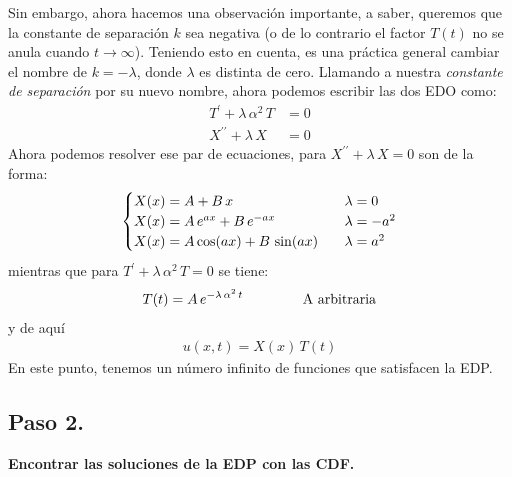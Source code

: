 \par
Sin embargo, ahora hacemos una observación importante, a saber, queremos que la constante de separación $k$ sea negativa (o de lo contrario el factor $T (t)$ no se anula cuando $t \to \infty$). Teniendo esto en cuenta, es una práctica general cambiar el nombre de $k = - \lambda$, donde $\lambda$ es distinta de cero. Llamando a nuestra \emph{constante de separación} por su nuevo nombre, ahora podemos escribir las dos EDO como:
\begin{align*}
T^{\prime} + \lambda \, \alpha^{2} \, T &= 0 \\[0.5em]
X^{\prime \prime} + \lambda \, X &= 0
\end{align*}
Ahora podemos resolver ese par de ecuaciones, para $X^{\prime \prime} + \lambda \, X = 0$ son de la forma:
\begin{align}
\begin{cases}
X(x) = A + B \, x & \hspace{0.2cm} \lambda = 0 \\
X(x) = A \, e^{a x} + B \, e^{-a x} & \hspace{0.2cm} \lambda = - a^{2} \\
X(x) = A \cos (a x ) + B \, \sin (a x) & \hspace{0.2cm} \lambda = a^{2}
\end{cases}
\label{eq:ecuacion_06_02_31}
\end{align}
mientras que para $T^{\prime} + \lambda \, \alpha^{2} \, T = 0$ se tiene:
\begin{align}
T(t) = A \, e^{- \lambda \, \alpha^{2} \, t} \hspace{1.5cm} \mbox{A arbitraria}
\label{eq:ecuacion_06_02_36a}    
\end{align}
y de aquí
\begin{align*}
u(x, t) = X(x) \, T(t) 
\end{align*}
En este punto, tenemos un número infinito de funciones que satisfacen la EDP.
\subsection{Paso 2.}
\textbf{Encontrar las soluciones de la EDP con las CDF.}

